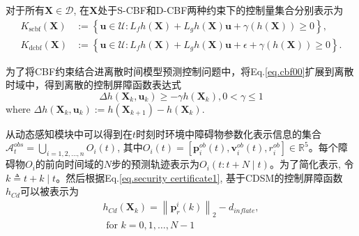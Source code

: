 \documentclass[preprint,5p,times,twocolumn]{elsarticle}
\begin{document}
对于所有$\boldsymbol{X} \in \mathcal{D}$, 在$\boldsymbol{X}$处于S-CBF和D-CBF两种约束下的控制量集合分别表示为
\begin{equation}
\label{eq.safeU}
\begin{aligned}
K_{\mathrm{scbf}}(\boldsymbol{X})&:=\left\{\boldsymbol{u} \in \mathcal{U}: L_f h(\boldsymbol{X})+L_g h(\boldsymbol{X}) \boldsymbol{u}+\gamma(h(\boldsymbol{X})) \geq 0\right\},\\
K_{\mathrm{dcbf}}(\boldsymbol{X})&:=\left\{\boldsymbol{u} \in \mathcal{U}: L_f h(\boldsymbol{X})+L_g h(\boldsymbol{X}) \boldsymbol{u}+\epsilon+\gamma(h(\boldsymbol{X})) \geq 0\right\}.
\end{aligned}
\end{equation}

为了将CBF约束结合进离散时间模型预测控制问题中，将Eq.\ref{eq.cbf00}扩展到离散时域中，得到离散的控制屏障函数表达式
\begin{equation}
\label{eq.cbf01}
\Delta h\left(\boldsymbol{X}_k, \boldsymbol{u}_k\right) \geq-\gamma h\left(\boldsymbol{X}_k\right), 0<\gamma \leq 1
\end{equation}
where $\Delta h\left(\boldsymbol{X}_k, \boldsymbol{u}_k\right):=h\left(\boldsymbol{X}_{k+1}\right)-h\left(\boldsymbol{X}_k\right)$.

从动态感知模块中可以得到在$t$时刻时环境中障碍物参数化表示信息的集合$\mathcal{A}_t^{obs}=\bigcup_{i=1,2, \ldots, n} O_i(t)$, 其中$O_i(t)=[\boldsymbol{p}^{ob}_i(t), \boldsymbol{v}^{ob}_i(t), r^{ob}_i] \in \mathbb{R}^5$。每个障碍物$O_i$的前向时间域的$N$步的预测轨迹表示为$O_i(t: t+N \mid t)$。为了简化表示, 令$k \triangleq t+k\mid t$。然后根据Eq.\ref{eq.security certificate1}, 基于CDSM的控制屏障函数$h_{Cd}$可以被表示为
\begin{equation}
\label{eq.hcd}
\begin{aligned}
h_{Cd}\left(\boldsymbol{X}_k\right)=\left\|\boldsymbol{p}_r^i(k)\right\|_2-d_{inflate},\\
\text { for } k=0,1, \ldots, N-1
\end{aligned}
\end{equation}
\end{document}
